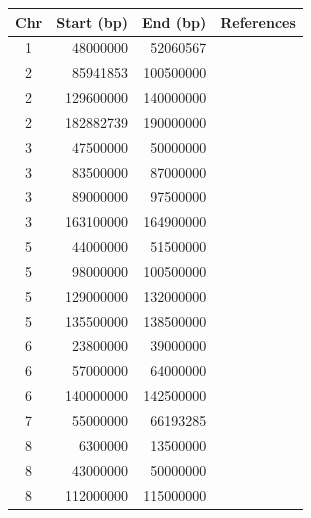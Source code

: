 \documentclass[12pt]{article}
\begin{document}
\begin{table}
\center
\begin{tabular}{crrl}
Chr & Start (bp) & End (bp) & References \\
\hline
1   & 48000000     & 52060567   &    \citep{anderson2010, price2008, weale2010} \\
2   & 85941853     & 100500000   &    \citep{anderson2010, price2008, weale2010} \\
2   & 129600000   & 140000000   &    \citep{price2008, novembre2008, weale2010, raska2012, conomos2016, prive2018} \\
2   & 182882739    & 190000000   &    \citep{anderson2010, price2008, weale2010} \\
3   & 47500000     & 50000000    &   \citep{anderson2010, price2008, weale2010}  \\
3   & 83500000     & 87000000    &   \citep{anderson2010, price2008, weale2010} \\
3   & 89000000     &   97500000   &    \citep{price2008, weale2010} \\
3   & 163100000    &   164900000   &    \citep{prive2018} \\
5   & 44000000     &   51500000    &   \citep{fellay2007, anderson2010, price2008, weale2010} \\
5   & 98000000     &  100500000   &    \citep{price2008, weale2010} \\
5   & 129000000    &   132000000   &    \citep{anderson2010, price2008, weale2010} \\
5   & 135500000    &   138500000   &   \citep{price2008, weale2010} \\
6   &  23800000     &   39000000   &    \citep{fellay2007, anderson2010, price2008, novembre2008, weale2010, raska2012, conomos2016, prive2018} \\
6   &  57000000     &   64000000   &    \citep{anderson2010, price2008, weale2010}  \\
6   & 140000000    &   142500000   &    \citep{anderson2010, price2008, weale2010}  \\
7   &  55000000     &   66193285   &    \citep{anderson2010, price2008, weale2010}  \\
8   &   6300000      &  13500000   &    \citep{fellay2007, anderson2010, price2008, novembre2008, tian2008, weale2010, raska2012, conomos2016, prive2018} \\
8   &  43000000    &    50000000   &    \citep{anderson2010, price2008, weale2010}  \\
8   & 112000000    &   115000000    &   \citep{anderson2010, price2008, weale2010} \\

\end{tabular}
\end{table}
\end{document}
